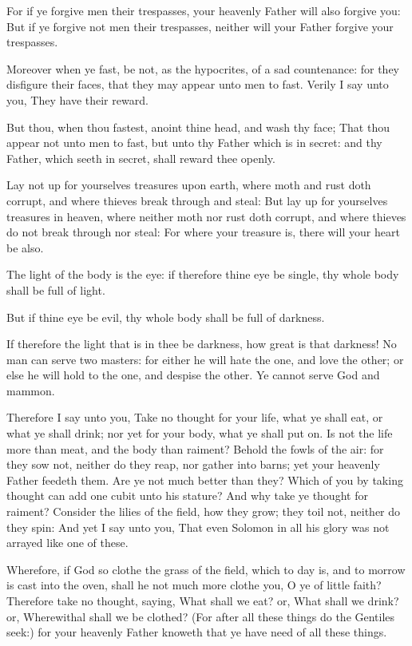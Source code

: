 \verse For if ye forgive men their trespasses, your heavenly Father will also forgive you: \verse But if ye forgive not men their trespasses, neither will your Father forgive your trespasses.

\verse Moreover when ye fast, be not, as the hypocrites, of a sad countenance: for they disfigure their faces, that they may appear unto men to fast. Verily I say unto you, They have their reward.

\verse But thou, when thou fastest, anoint thine head, and wash thy face; \verse That thou appear not unto men to fast, but unto thy Father which is in secret: and thy Father, which seeth in secret, shall reward thee openly.

\verse Lay not up for yourselves treasures upon earth, where moth and rust doth corrupt, and where thieves break through and steal: \verse But lay up for yourselves treasures in heaven, where neither moth nor rust doth corrupt, and where thieves do not break through nor steal: \verse For where your treasure is, there will your heart be also.

\verse The light of the body is the eye: if therefore thine eye be single, thy whole body shall be full of light.

\verse But if thine eye be evil, thy whole body shall be full of darkness.

If therefore the light that is in thee be darkness, how great is that darkness!  \verse No man can serve two masters: for either he will hate the one, and love the other; or else he will hold to the one, and despise the other. Ye cannot serve God and mammon.

\verse Therefore I say unto you, Take no thought for your life, what ye shall eat, or what ye shall drink; nor yet for your body, what ye shall put on. Is not the life more than meat, and the body than raiment?  \verse Behold the fowls of the air: for they sow not, neither do they reap, nor gather into barns; yet your heavenly Father feedeth them. Are ye not much better than they?  \verse Which of you by taking thought can add one cubit unto his stature?  \verse And why take ye thought for raiment? Consider the lilies of the field, how they grow; they toil not, neither do they spin: \verse And yet I say unto you, That even Solomon in all his glory was not arrayed like one of these.

\verse Wherefore, if God so clothe the grass of the field, which to day is, and to morrow is cast into the oven, shall he not much more clothe you, O ye of little faith?  \verse Therefore take no thought, saying, What shall we eat? or, What shall we drink? or, Wherewithal shall we be clothed?  \verse (For after all these things do the Gentiles seek:) for your heavenly Father knoweth that ye have need of all these things.

